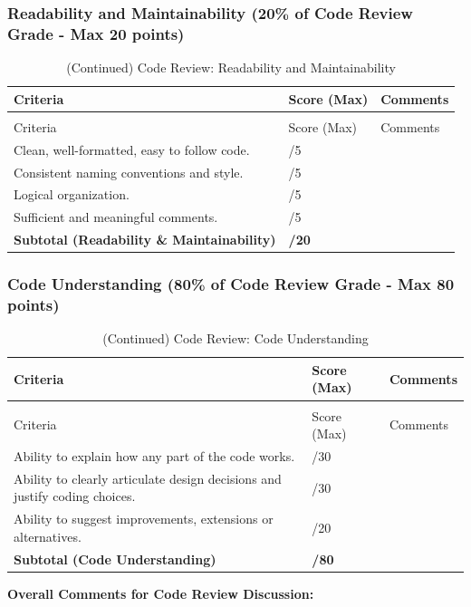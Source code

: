 \documentclass{article}
\begin{document}
\subsubsection*{Readability and Maintainability (20\% of Code Review Grade - Max 20 points)}
\begin{longtable}{@{}>{\RaggedRight\arraybackslash}p{} >{\centering\arraybackslash}p{} >{\RaggedRight\arraybackslash}p{}@{}}
\toprule
Criteria & Score (Max) & Comments \\
\midrule
\endfirsthead
\caption[]{(Continued) Code Review: Readability and Maintainability} \\
\toprule
Criteria & Score (Max) & Comments \\
\midrule
\endhead
\bottomrule
\endfoot
Clean, well-formatted, easy to follow code. & /5 & \\
\addlinespace
Consistent naming conventions and style. & /5 & \\
\addlinespace
Logical organization. & /5 & \\
\addlinespace
Sufficient and meaningful comments. & /5 & \\
\midrule
\textbf{Subtotal (Readability \& Maintainability)} & \textbf{/20} & \\
\end{longtable}

\subsubsection*{Code Understanding (80\% of Code Review Grade - Max 80 points)}
\begin{longtable}{@{}>{\RaggedRight\arraybackslash}p{} >{\centering\arraybackslash}p{} >{\RaggedRight\arraybackslash}p{}@{}}
\toprule
Criteria & Score (Max) & Comments \\
\midrule
\endfirsthead
\caption[]{(Continued) Code Review: Code Understanding} \\
\toprule
Criteria & Score (Max) & Comments \\
\midrule
\endhead
\bottomrule
\endfoot
Ability to explain how any part of the code works. & /30 & \\ 
\addlinespace
Ability to clearly articulate design decisions and justify coding choices. & /30 & \\
\addlinespace
Ability to suggest improvements, extensions or alternatives. & /20 & \\ 
\midrule
\textbf{Subtotal (Code Understanding)} & \textbf{/80} & \\
\end{longtable}

\textbf{Overall Comments for Code Review Discussion:}
\end{document}

